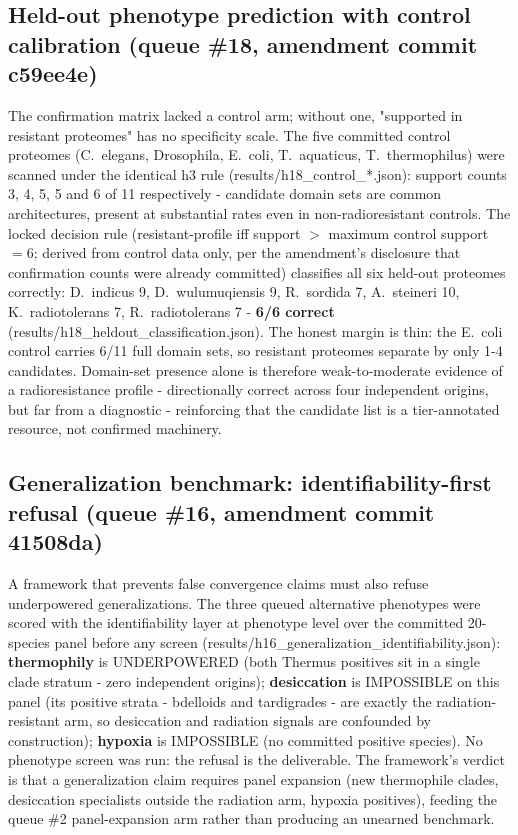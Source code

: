 \documentclass[12pt,a4paper]{article}
\begin{document}
\subsection{Held-out phenotype prediction with control calibration (queue \#18, amendment commit c59ee4e)}
The confirmation matrix lacked a control arm; without one, "supported in resistant proteomes" has no specificity scale. The five committed control proteomes (C.\ elegans, Drosophila, E.\ coli, T.\ aquaticus, T.\ thermophilus) were scanned under the identical h3 rule (results/h18\_control\_*.json): support counts 3, 4, 5, 5 and 6 of 11 respectively - candidate domain sets are common architectures, present at substantial rates even in non-radioresistant controls. The locked decision rule (resistant-profile iff support $>$ maximum control support $=6$; derived from control data only, per the amendment's disclosure that confirmation counts were already committed) classifies all six held-out proteomes correctly: D.\ indicus 9, D.\ wulumuqiensis 9, R.\ sordida 7, A.\ steineri 10, K.\ radiotolerans 7, R.\ radiotolerans 7 - \textbf{6/6 correct} (results/h18\_heldout\_classification.json). The honest margin is thin: the E.\ coli control carries 6/11 full domain sets, so resistant proteomes separate by only 1-4 candidates. Domain-set presence alone is therefore weak-to-moderate evidence of a radioresistance profile - directionally correct across four independent origins, but far from a diagnostic - reinforcing that the candidate list is a tier-annotated resource, not confirmed machinery.


\subsection{Generalization benchmark: identifiability-first refusal (queue \#16, amendment commit 41508da)}
A framework that prevents false convergence claims must also refuse underpowered generalizations. The three queued alternative phenotypes were scored with the identifiability layer at phenotype level over the committed 20-species panel before any screen (results/h16\_generalization\_identifiability.json): \textbf{thermophily} is UNDERPOWERED (both Thermus positives sit in a single clade stratum - zero independent origins); \textbf{desiccation} is IMPOSSIBLE on this panel (its positive strata - bdelloids and tardigrades - are exactly the radiation-resistant arm, so desiccation and radiation signals are confounded by construction); \textbf{hypoxia} is IMPOSSIBLE (no committed positive species). No phenotype screen was run: the refusal is the deliverable. The framework's verdict is that a generalization claim requires panel expansion (new thermophile clades, desiccation specialists outside the radiation arm, hypoxia positives), feeding the queue \#2 panel-expansion arm rather than producing an unearned benchmark.
\end{document}
